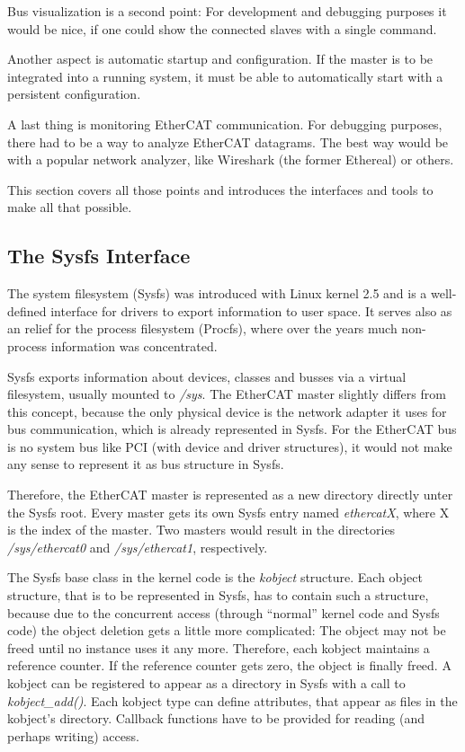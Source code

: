 \documentclass[a4paper,12pt,BCOR6mm,bibtotoc,idxtotoc]{scrbook}
\begin{document}
Bus visualization is a second point: For development and debugging
purposes it would be nice, if one could show the connected slaves with
a single command.

Another aspect is automatic startup and configuration. If the master
is to be integrated into a running system, it must be able to
automatically start with a persistent configuration.

A last thing is monitoring EtherCAT communication. For debugging
purposes, there had to be a way to analyze EtherCAT datagrams. The
best way would be with a popular network analyzer, like Wireshark
\cite{wireshark} (the former Ethereal) or others.

This section covers all those points and introduces the interfaces and
tools to make all that possible.


\subsection{The Sysfs Interface}
\label{sec:sysfs}

The system filesystem (Sysfs) was introduced with Linux
kernel 2.5 and is a well-defined interface for drivers to export
information to user space. It serves also as an relief for the process
filesystem (Procfs), where over the years much non-process information
was concentrated.

Sysfs exports information about devices, classes and busses via a
virtual filesystem, usually mounted to \textit{/sys}. The EtherCAT
master slightly differs from this concept, because the only physical
device is the network adapter it uses for bus communication, which is
already represented in Sysfs. For the EtherCAT bus is no system bus
like PCI (with device and driver structures), it would not make any
sense to represent it as bus structure in Sysfs.

Therefore, the EtherCAT master is represented as a new directory
directly unter the Sysfs root. Every master gets its own Sysfs entry
named \textit{ethercatX}, where X is the index of the master. Two
masters would result in the directories \textit{/sys/ethercat0} and
\textit{/sys/ethercat1}, respectively.

The Sysfs base class in the kernel code is the \textit{kobject}
structure. Each object structure, that is to be represented in Sysfs,
has to contain such a structure, because due to the concurrent access
(through ``normal'' kernel code and Sysfs code) the object deletion
gets a little more complicated: The object may not be freed until no
instance uses it any more. Therefore, each kobject maintains a
reference counter. If the reference counter gets zero, the object is
finally freed. A kobject can be registered to appear as a directory in
Sysfs with a call to \textit{kobject\_add()}. Each kobject type can
define attributes, that appear as files in the kobject's
directory. Callback functions have to be provided for reading (and
perhaps writing) access.
\end{document}
